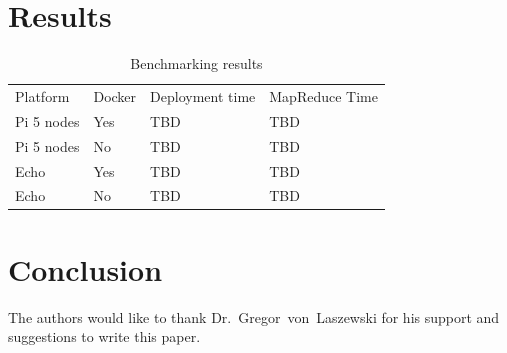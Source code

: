 \section{Results}

\begin{table}[hbt]
\centering
\caption{Benchmarking results}\label{t:results-table}
\begin{tabular}{llll}
Platform    & Docker & Deployment time & MapReduce Time \\
Pi 5 nodes  & Yes    & TBD             & TBD            \\
Pi 5 nodes  & No     & TBD             & TBD            \\
Echo        & Yes    & TBD             & TBD            \\
Echo        & No     & TBD             & TBD            \\
\end{tabular}
\end{table}



\section{Conclusion}



\begin{acks}

  The authors would like to thank Dr.~Gregor~von~Laszewski for his
  support and suggestions to write this paper.

\end{acks}



